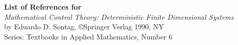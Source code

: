 
\topmargin -0.5in
\textheight 8.8in
\oddsidemargin 0.0in
\evensidemargin 0.0in
\textwidth 6.7in



\begin{center}
{\bf List of References for}\\
{\it Mathematical Control Theory: Deterministic Finite Dimensional Systems}\\
by Eduardo D. Sontag, \copyright Springer Verlag 1990, NY\\
Series: Textbooks in Applied Mathematics, Number 6
\end{center}
\vspace{1.0cm}
